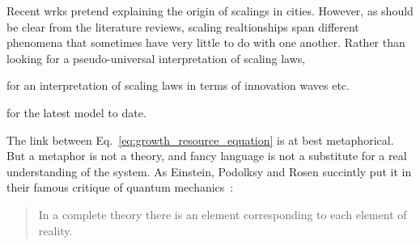 Recent wrks pretend explaining the origin of scalings in cities. However,
as should be clear from the literature reviews, scaling realtionships span
different phenomena that sometimes have very little to do with one another.
Rather than looking for a pseudo-universal interpretation of scaling laws, 

\cite{Pumain:2006} for an interpretation of scaling laws in terms of
innovation waves etc.

\cite{Bettencourt:2013} for the latest model to date.

The link between Eq.~\ref{eq:growth_resource_equation} is at best metaphorical.
But a metaphor is not a theory, and fancy language is not a substitute for a
real understanding of the system. As Einstein, Podolksy and Rosen succintly put
it in their famous critique of quantum mechanics~\cite{Einstein:1935}:

\begin{quote}
    In a complete theory there is an element corresponding to each element of
    reality.
\end{quote}

